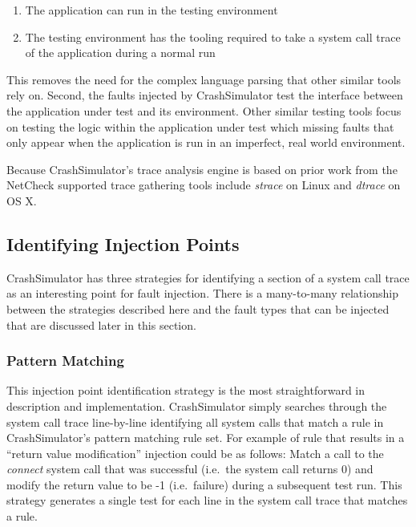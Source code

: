         \begin{enumerate}
            \item{The application can run in the testing environment}
            \item{The testing environment has the tooling required to take a system call trace of the application during
            a normal run}
        \end{enumerate}

        This removes the need for the complex language parsing that other similar tools rely on. Second, the faults
        injected by CrashSimulator test the interface between the application under test and its environment. Other
        similar testing tools focus on testing the logic within the application under test which missing faults that
        only appear when the application is run in an imperfect, real world environment.

        Because CrashSimulator's trace analysis engine is based on prior work from the NetCheck supported trace
        gathering tools include \emph{strace} on Linux and \emph{dtrace} on OS X.

    \subsection{Identifying Injection Points}

        CrashSimulator has three strategies for identifying a section of a system call trace as an interesting point for
        fault injection. There is a many-to-many relationship between the strategies described here and the fault types
        that can be injected that are discussed later in this section.

        \subsubsection{Pattern Matching}

            This injection point identification strategy is the most straightforward in description and implementation.
            CrashSimulator simply searches through the system call trace line-by-line identifying all system calls that
            match a rule in CrashSimulator's pattern matching rule set. For example of rule that results in a ``return
            value modification'' injection could be as follows: Match a call to the \emph{connect} system call that was
            successful (i.e.\ the system call returns 0) and modify the return value to be -1 (i.e.\ failure) during a
            subsequent test run. This strategy generates a single test for each line in the system call trace that
            matches a rule.

